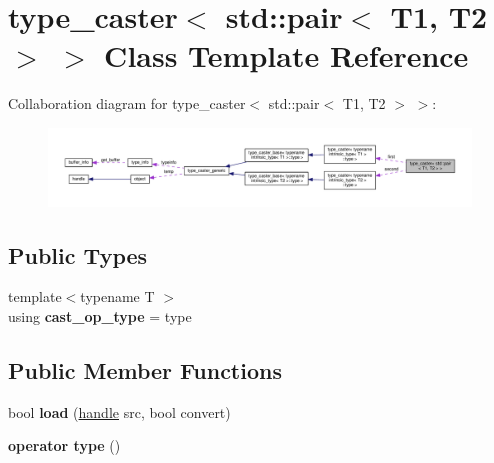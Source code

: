 \hypertarget{classtype__caster_3_01std_1_1pair_3_01_t1_00_01_t2_01_4_01_4}{}\section{type\+\_\+caster$<$ std\+:\+:pair$<$ T1, T2 $>$ $>$ Class Template Reference}
\label{classtype__caster_3_01std_1_1pair_3_01_t1_00_01_t2_01_4_01_4}


Collaboration diagram for type\+\_\+caster$<$ std\+:\+:pair$<$ T1, T2 $>$ $>$\+:
\nopagebreak
\begin{figure}[H]
\begin{center}
\leavevmode
\includegraphics[width=350pt]{classtype__caster_3_01std_1_1pair_3_01_t1_00_01_t2_01_4_01_4__coll__graph}
\end{center}
\end{figure}
\subsection*{Public Types}
\begin{DoxyCompactItemize}
\item 
{\footnotesize template$<$typename T $>$ }\\using {\bfseries cast\+\_\+op\+\_\+type} = type\hypertarget{classtype__caster_3_01std_1_1pair_3_01_t1_00_01_t2_01_4_01_4_a583ead3810c4782be7e3131b15773420}{}\label{classtype__caster_3_01std_1_1pair_3_01_t1_00_01_t2_01_4_01_4_a583ead3810c4782be7e3131b15773420}

\end{DoxyCompactItemize}
\subsection*{Public Member Functions}
\begin{DoxyCompactItemize}
\item 
bool {\bfseries load} (\hyperlink{classhandle}{handle} src, bool convert)\hypertarget{classtype__caster_3_01std_1_1pair_3_01_t1_00_01_t2_01_4_01_4_af242d29d0d51fee08192c0e9dbc3d270}{}\label{classtype__caster_3_01std_1_1pair_3_01_t1_00_01_t2_01_4_01_4_af242d29d0d51fee08192c0e9dbc3d270}

\item 
{\bfseries operator type} ()\hypertarget{classtype__caster_3_01std_1_1pair_3_01_t1_00_01_t2_01_4_01_4_ab9197df41b080ddbf2482d1cf402083b}{}\label{classtype__caster_3_01std_1_1pair_3_01_t1_00_01_t2_01_4_01_4_ab9197df41b080ddbf2482d1cf402083b}

\end{DoxyCompactItemize}
